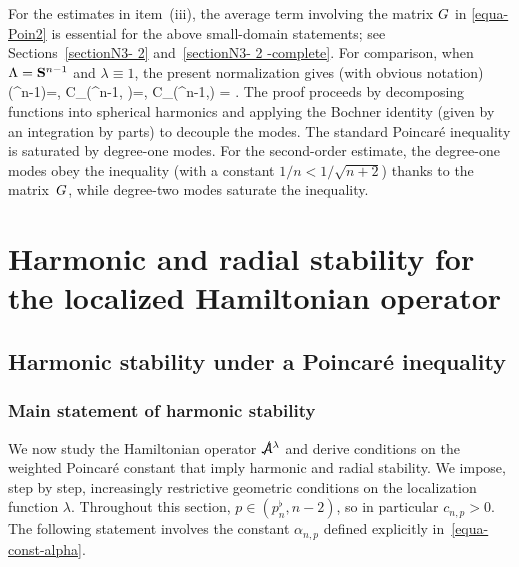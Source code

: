 \documentclass[11pt]{article}
\numberwithin{table}{section}
\numberwithin{equation}{section}
\numberwithin{table}{section}
\numberwithin{figure}{section}
\begin{document}
For the estimates in item~(iii), the average term involving the matrix $G$ in \eqref{equa-Poin2} is essential for the above small-domain statements;  see Sections~\ref{sectionN3- 2} and~\ref{sectionN3- 2 -complete}. For comparison, when $\Lambda =\mathbf{S}^{n-1}$ and $\lambda\equiv 1$, the present normalization gives (with obvious notation)
\diam(\Sphe^{n-1})=\pi,
\quad C_\Poin(\Sphe^{n-1}, \lambda {})=, 
\quad C_{}(\Sphe^{n-1},\lambda{}) = .
\ee
The proof proceeds by decomposing functions into spherical harmonics and applying the Bochner identity (given by an integration by parts) to decouple the modes.
The standard Poincaré inequality is saturated by degree-one modes.
For the second-order estimate, the degree-one modes obey the inequality (with a constant $1/n<1/\sqrt{n+2}$) thanks to the matrix~$G$, while degree-two modes saturate the inequality.


\section{Harmonic and radial stability for the localized Hamiltonian operator}
\label{section-3}

\subsection{Harmonic stability under a Poincaré inequality}
\label{sectionN4-1}

\subsubsection{Main statement of harmonic stability}

We now study the Hamiltonian operator $\ssA^\lambda$ and derive conditions on the weighted Poincar\'e constant that imply harmonic and radial stability. We impose, step by step, increasingly restrictive geometric conditions on the localization function $\lambda$. Throughout this section, $p\in(p_n^\flat,n- 2)$, so in particular $c_{n,p}>0$. The following statement involves the constant $\alpha_{n,p}$ defined explicitly in~\eqref{equa-const-alpha}.
\end{document}
